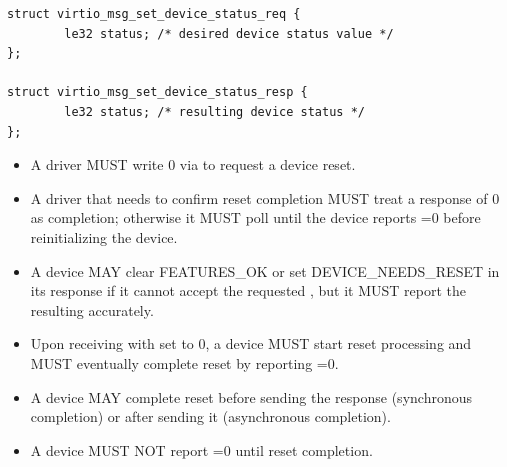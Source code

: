 \begin{lstlisting}
struct virtio_msg_set_device_status_req {
        le32 status; /* desired device status value */
};

struct virtio_msg_set_device_status_resp {
        le32 status; /* resulting device status */
};
\end{lstlisting}

\begin{itemize}
  \item A driver MUST write 0 via  to request a device
        reset.
  \item A driver that needs to confirm reset completion MUST treat a
         response  of 0 as completion;
        otherwise it MUST poll  until the device
        reports =0 before reinitializing the device.
\end{itemize}

\begin{itemize}
  \item A device MAY clear FEATURES\_OK or set DEVICE\_NEEDS\_RESET in its
        response if it cannot accept the requested , but it MUST
        report the resulting  accurately.
  \item Upon receiving  with  set to 0,
        a device MUST start reset processing and MUST eventually complete reset
        by reporting =0.
  \item A device MAY complete reset before sending the
         response (synchronous completion) or after
        sending it (asynchronous completion).
  \item A device MUST NOT report =0 until reset completion.
\end{itemize}

